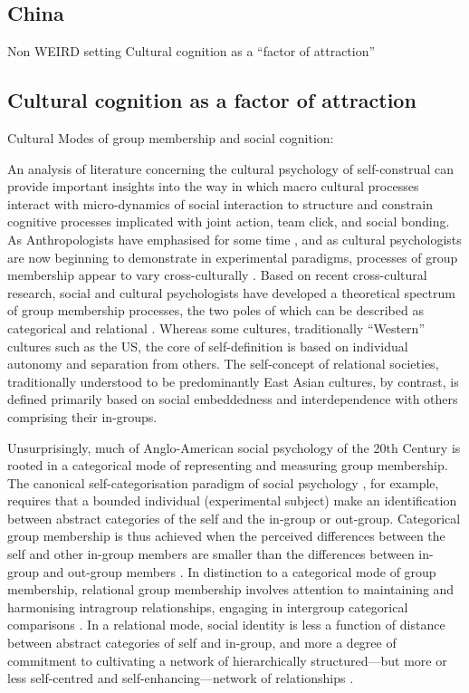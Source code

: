   \subsection{China}
    Non WEIRD setting
    Cultural cognition as a ``factor of attraction''

  \subsection{Cultural cognition as a factor of attraction}

  Cultural Modes of group membership and social cognition:

  An analysis of literature concerning the cultural psychology of self-construal can provide important insights into the way in which macro cultural processes interact with micro-dynamics of social interaction to structure and constrain cognitive processes implicated with joint action, team click, and social bonding.  As Anthropologists have emphasised for some time \citep{Strodtbeck1961,Kluckhohn1961,Mead1967,Fei1992}, and as cultural psychologists are now beginning to demonstrate in experimental paradigms, processes of group membership appear to vary cross-culturally \citep{Markus1991,Nisbett2001}.  Based on recent cross-cultural research, social and cultural psychologists have developed a theoretical spectrum of group membership processes, the two poles of which can be described as categorical and relational \citep{Hofstede1980,Brewer2007}.  Whereas some cultures, traditionally ``Western'' cultures such as the US, the core of self-definition is based on individual autonomy and separation from others.
  The self-concept of relational societies, traditionally understood to be predominantly East Asian cultures, by contrast, is defined primarily based on social embeddedness and interdependence with others comprising their in-groups\citep{Leung2012}.

  Unsurprisingly, much of Anglo-American social psychology of the 20th Century is rooted in a categorical mode of representing and measuring group membership.  The canonical self-categorisation paradigm of social psychology \citep{Turner1987}, for example, requires that a bounded individual (experimental subject) make an identification between abstract categories of the self and the in-group or out-group.  Categorical group membership is thus achieved when the perceived differences between the self and other in-group members are smaller than the differences between in-group and out-group members \citep{Yuki2014}.  In distinction to a categorical mode of group membership, relational group membership involves attention to maintaining and harmonising intragroup relationships, engaging in intergroup categorical comparisons \citep{Yuki2003}.
  In a relational mode, social identity is less a function of distance between abstract categories of self and in-group, and more a degree of commitment to cultivating a network of hierarchically structured---but more or less self-centred and self-enhancing---network of relationships \citep{Liu2009,Nisbett2003}.


